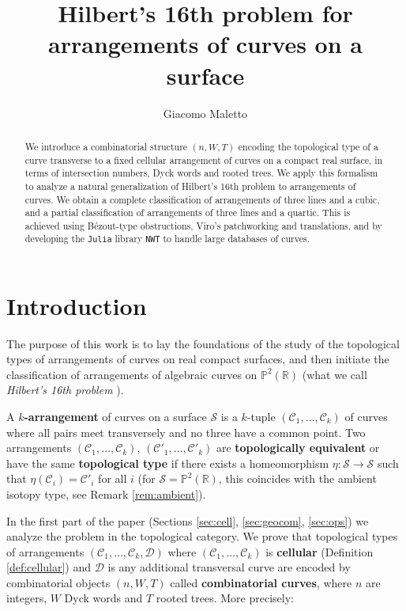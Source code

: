 \documentclass[11pt,reqno]{amsart}
\title{Hilbert's 16th problem for arrangements of curves on a surface}
\author{Giacomo Maletto}
\date{}
\theoremstyle{plain}
\theoremstyle{definition}
\theoremstyle{remark}
\numberwithin{equation}{subsection}
\newcommand*{\bbP}{\mathbb{P}}
\newcommand*{\bbR}{\mathbb{R}}
\newcommand*{\calC}{\mathcal{C}}
\newcommand*{\calD}{\mathcal{D}}
\newcommand*{\calS}{\mathcal{S}}
\begin{document}
\begin{abstract}
    We introduce a combinatorial structure $(n,W,T)$ encoding the topological type of a curve transverse to a fixed cellular arrangement of curves on a compact real surface, in terms of intersection numbers, Dyck words and rooted trees. We apply this formalism to analyze a natural generalization of Hilbert's 16th problem to arrangements of curves. We obtain a complete classification of arrangements of three lines and a cubic, and a partial classification of arrangements of three lines and a quartic. This is achieved using Bézout-type obstructions, Viro's patchworking and translations, and by developing the \texttt{Julia} library \texttt{NWT} to handle large databases of curves.
\end{abstract}

\maketitle

\section{Introduction}

The purpose of this work is to lay the foundations of the study of the topological types of arrangements of curves on real compact surfaces, and then initiate the classification of arrangements of algebraic curves on $\bbP^2(\bbR)$ (what we call \textit{Hilbert's 16th problem} \cite{hilbert}).

A \textbf{$k$-arrangement} of curves on a surface $\calS$ is a $k$-tuple $(\calC_1,\dots,\calC_k)$ of curves where all pairs meet transversely and no three have a common point. Two arrangements $(\calC_1,\dots,\calC_k)$, $(\calC'_1,\dots,\calC'_k)$ are \textbf{topologically equivalent} or have the same \textbf{topological type} if there exists a homeomorphism $\eta\colon\calS\to\calS$ such that $\eta(\calC_i)=\calC'_i$ for all $i$ (for $\calS=\bbP^2(\bbR)$, this coincides with the ambient isotopy type, see Remark \ref{rem:ambient}).

In the first part of the paper (Sections \ref{sec:cell}, \ref{sec:geocom}, \ref{sec:ops}) we analyze the problem in the topological category. We prove that topological types of arrangements $(\calC_1,\dots,\calC_k,\calD)$ where $(\calC_1,\dots,\calC_k)$ is \textbf{cellular} (Definition \ref{def:cellular}) and $\calD$ is any additional transversal curve are encoded by combinatorial objects $(n,W,T)$ called \textbf{combinatorial curves}, where $n$ are integers, $W$ Dyck words and $T$ rooted trees. More precisely:
\end{document}
